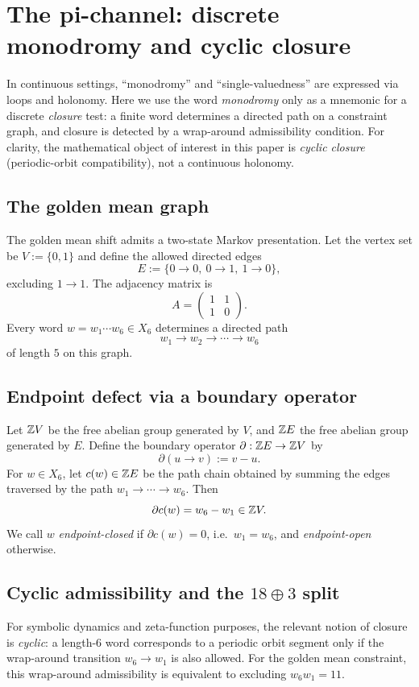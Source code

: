 
\section{The pi-channel: discrete monodromy and cyclic closure}
\label{sec:pi_constraint}

In continuous settings, ``monodromy'' and ``single-valuedness'' are expressed via loops and holonomy.
Here we use the word \emph{monodromy} only as a mnemonic for a discrete \emph{closure} test:
a finite word determines a directed path on a constraint graph, and closure is detected by a wrap-around admissibility condition.
For clarity, the mathematical object of interest in this paper is \emph{cyclic closure} (periodic-orbit compatibility), not a continuous holonomy.

\subsection{The golden mean graph}
The golden mean shift admits a two-state Markov presentation.
Let the vertex set be $V:=\{0,1\}$ and define the allowed directed edges
\[
E:=\{0\to 0,\ 0\to 1,\ 1\to 0\},
\]
excluding $1\to 1$.
The adjacency matrix is
\[
A=\begin{pmatrix}1&1\\[2pt] 1&0\end{pmatrix}.
\]
Every word $w=w_1\cdots w_6\in X_6$ determines a directed path
\[
w_1\to w_2\to\cdots\to w_6
\]
of length $5$ on this graph.

\subsection{Endpoint defect via a boundary operator}
Let $\mathbb{Z} V$ be the free abelian group generated by $V$, and $\mathbb{Z} E$ the free abelian group generated by $E$.
Define the boundary operator $\partial:\mathbb{Z} E\to \mathbb{Z} V$ by
\[
\partial(u\to v):=v-u.
\]
For $w\in X_6$, let $c(w)\in \mathbb{Z} E$ be the path chain obtained by summing the edges traversed by the path $w_1\to\cdots\to w_6$.
Then
\[
\partial c(w)=w_6-w_1\in \mathbb{Z} V.
\]
We call $w$ \emph{endpoint-closed} if $\partial c(w)=0$, i.e.\ $w_1=w_6$, and \emph{endpoint-open} otherwise.

\subsection{Cyclic admissibility and the \texorpdfstring{$18\oplus 3$}{18+3} split}
For symbolic dynamics and zeta-function purposes, the relevant notion of closure is \emph{cyclic}:
a length-$6$ word corresponds to a periodic orbit segment only if the wrap-around transition $w_6\to w_1$ is also allowed.
For the golden mean constraint, this wrap-around admissibility is equivalent to excluding $w_6w_1=11$.

